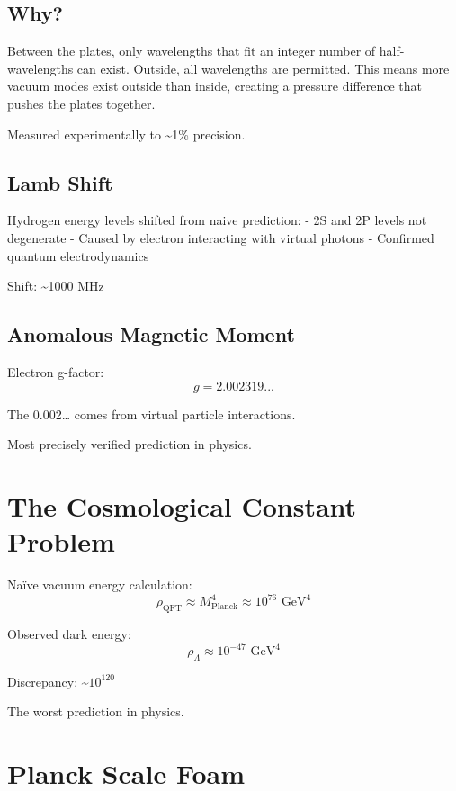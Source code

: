 \documentclass[
  11pt,
  letterpaper,
  twoside,
  openright]{book}
\begin{document}
\subsection{Why?}\label{why}

Between the plates, only wavelengths that fit an integer number of
half-wavelengths can exist. Outside, all wavelengths are permitted. This
means more vacuum modes exist outside than inside, creating a pressure
difference that pushes the plates together.

Measured experimentally to \textasciitilde1\% precision.

\subsection{Lamb Shift}\label{lamb-shift}

Hydrogen energy levels shifted from naive prediction: - 2S and 2P levels
not degenerate - Caused by electron interacting with virtual photons -
Confirmed quantum electrodynamics

Shift: \textasciitilde1000 MHz

\subsection{Anomalous Magnetic Moment}\label{anomalous-magnetic-moment}

Electron g-factor: \[
g = 2.002319...
\]

The 0.002\ldots{} comes from virtual particle interactions.

Most precisely verified prediction in physics.

\section{The Cosmological Constant
Problem}\label{the-cosmological-constant-problem-1}

Naïve vacuum energy calculation: \[
\rho_{\text{QFT}} \approx M_{\text{Planck}}^4 \approx 10^{76} \text{ GeV}^4
\]

Observed dark energy: \[
\rho_{\Lambda} \approx 10^{-47} \text{ GeV}^4
\]

Discrepancy: \textasciitilde{}\(10^{120}\)

The worst prediction in physics.

\section{Planck Scale Foam}\label{planck-scale-foam}
\end{document}
